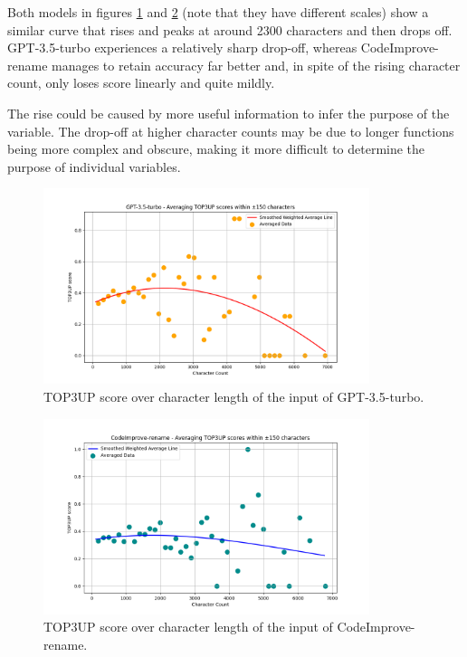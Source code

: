         Both models in figures \ref{fig:rename_length_gpt} and \ref{fig:rename_length_codeimporove} (note that they have different scales) show a similar curve that rises and peaks at around 2300 characters and then drops off. GPT-3.5-turbo experiences a relatively sharp drop-off, whereas CodeImprove-rename manages to retain accuracy far better and, in spite of the rising character count, only loses score linearly and quite mildly.
        
        The rise could be caused by more useful information to infer the purpose of the variable. The drop-off at higher character counts may be due to longer functions being more complex and obscure, making it more difficult to determine the purpose of individual variables.

        \begin{figure}[H]
          \centering
          \includegraphics[width=0.85\textwidth]{obrazky-figures/gpt3turbo-rename-average.png}
           \caption{TOP3UP score over character length of the input of GPT-3.5-turbo.}
          \label{fig:rename_length_gpt}
        \end{figure}
        \begin{figure}[H]
          \centering
          \includegraphics[width=0.85\textwidth]{obrazky-figures/codeImprove-rename-average.png}
           \caption{TOP3UP score over character length of the input of CodeImprove-rename.}
          \label{fig:rename_length_codeimporove}
        \end{figure}

